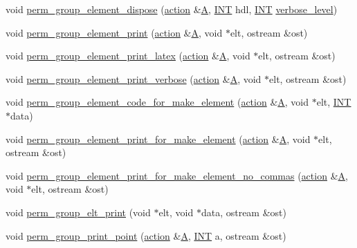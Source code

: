 \begin{DoxyCompactItemize}
\item 
void \mbox{\hyperlink{interface__perm__group_8_c_a7acd913c897a8bbbc47e4e4f1a63a6c2}{perm\+\_\+group\+\_\+element\+\_\+dispose}} (\mbox{\hyperlink{classaction}{action}} \&\mbox{\hyperlink{simeon_8_c_a97833f04c3a9c008df5521a2fc291bb4}{A}}, \mbox{\hyperlink{galois_8h_a09fddde158a3a20bd2dcadb609de11dc}{I\+NT}} hdl, \mbox{\hyperlink{galois_8h_a09fddde158a3a20bd2dcadb609de11dc}{I\+NT}} \mbox{\hyperlink{simeon_8_c_a818073fbcc2f439e7c56952f67386122}{verbose\+\_\+level}})
\item 
void \mbox{\hyperlink{interface__perm__group_8_c_a05f9a5ad53e1e2fd3c88dd67b7d948e3}{perm\+\_\+group\+\_\+element\+\_\+print}} (\mbox{\hyperlink{classaction}{action}} \&\mbox{\hyperlink{simeon_8_c_a97833f04c3a9c008df5521a2fc291bb4}{A}}, void $\ast$elt, ostream \&ost)
\item 
void \mbox{\hyperlink{interface__perm__group_8_c_a9fa3c6e68a871e577b93ee32f6021f33}{perm\+\_\+group\+\_\+element\+\_\+print\+\_\+latex}} (\mbox{\hyperlink{classaction}{action}} \&\mbox{\hyperlink{simeon_8_c_a97833f04c3a9c008df5521a2fc291bb4}{A}}, void $\ast$elt, ostream \&ost)
\item 
void \mbox{\hyperlink{interface__perm__group_8_c_a1e5b593f422efa2643f04d5e33b9b6d2}{perm\+\_\+group\+\_\+element\+\_\+print\+\_\+verbose}} (\mbox{\hyperlink{classaction}{action}} \&\mbox{\hyperlink{simeon_8_c_a97833f04c3a9c008df5521a2fc291bb4}{A}}, void $\ast$elt, ostream \&ost)
\item 
void \mbox{\hyperlink{interface__perm__group_8_c_a242b38cb629b026f53504d8bc9443d23}{perm\+\_\+group\+\_\+element\+\_\+code\+\_\+for\+\_\+make\+\_\+element}} (\mbox{\hyperlink{classaction}{action}} \&\mbox{\hyperlink{simeon_8_c_a97833f04c3a9c008df5521a2fc291bb4}{A}}, void $\ast$elt, \mbox{\hyperlink{galois_8h_a09fddde158a3a20bd2dcadb609de11dc}{I\+NT}} $\ast$data)
\item 
void \mbox{\hyperlink{interface__perm__group_8_c_a1580f278004e957a65ea496615b971e4}{perm\+\_\+group\+\_\+element\+\_\+print\+\_\+for\+\_\+make\+\_\+element}} (\mbox{\hyperlink{classaction}{action}} \&\mbox{\hyperlink{simeon_8_c_a97833f04c3a9c008df5521a2fc291bb4}{A}}, void $\ast$elt, ostream \&ost)
\item 
void \mbox{\hyperlink{interface__perm__group_8_c_a2b19744c627f6e6c2e027a3ae164ad95}{perm\+\_\+group\+\_\+element\+\_\+print\+\_\+for\+\_\+make\+\_\+element\+\_\+no\+\_\+commas}} (\mbox{\hyperlink{classaction}{action}} \&\mbox{\hyperlink{simeon_8_c_a97833f04c3a9c008df5521a2fc291bb4}{A}}, void $\ast$elt, ostream \&ost)
\item 
void \mbox{\hyperlink{interface__perm__group_8_c_a46edc9ed5e8ff15fad56165dad297e48}{perm\+\_\+group\+\_\+elt\+\_\+print}} (void $\ast$elt, void $\ast$data, ostream \&ost)
\item 
void \mbox{\hyperlink{interface__perm__group_8_c_a057224b2737a65d7590c4e3596d53ce8}{perm\+\_\+group\+\_\+print\+\_\+point}} (\mbox{\hyperlink{classaction}{action}} \&\mbox{\hyperlink{simeon_8_c_a97833f04c3a9c008df5521a2fc291bb4}{A}}, \mbox{\hyperlink{galois_8h_a09fddde158a3a20bd2dcadb609de11dc}{I\+NT}} a, ostream \&ost)
\end{DoxyCompactItemize}


